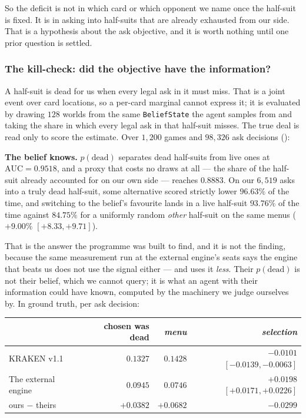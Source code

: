 \documentclass[11pt,letterpaper]{article}
\begin{document}
So the deficit is not in which card or which opponent we name once the
half-suit is fixed. It is in asking into half-suits that are already exhausted
from our side. That is a hypothesis about the ask objective, and it is worth
nothing until one prior question is settled.

\subsubsection{The kill-check: did the objective have the information?}

A half-suit is dead for us when every legal ask in it must miss. That is a
joint event over card locations, so a per-card marginal cannot express it; it
is evaluated by drawing $128$ worlds from the same \texttt{BeliefState} the
agent samples from and taking the share in which every legal ask in that
half-suit misses. The true deal is read only to score the estimate. Over
$1{,}200$ games and $98{,}326$ ask decisions
():

\textbf{The belief knows.} $p(\text{dead})$ separates dead half-suits from live
ones at $\mathrm{AUC} = 0.9518$, and a proxy that costs no draws at all --- the
share of the half-suit already accounted for on our own side --- reaches
$0.8883$. On our $6{,}519$ asks into a truly dead half-suit, some alternative
scored strictly lower $96.63\%$ of the time, and switching to the belief's
favourite lands in a live half-suit $93.76\%$ of the time against $84.75\%$ for
a uniformly random \emph{other} half-suit on the same menus
($+9.00\%$ $[+8.33, +9.71]$).

That is the answer the programme was built to find, and it is not the finding,
because the same measurement run at the external engine's seats says the engine that beats
us does not use the signal either --- and uses it \emph{less}. Their
$p(\text{dead})$ is not their belief, which we cannot query; it is what an agent
with their information could have known, computed by the machinery we judge
ourselves by. In ground truth, per ask decision:

\begin{center}
\small
\begin{tabular}{lrrr}
\toprule
 & chosen was dead & \emph{menu} & \emph{selection} \\
\midrule
KRAKEN v1.1 & $0.1327$ & $0.1428$ & $\mathbf{-0.0101}$ $[-0.0139, -0.0063]$ \\
The external engine & $0.0945$ & $0.0746$ & $\mathbf{+0.0198}$ $[+0.0171, +0.0226]$ \\
\midrule
ours $-$ theirs & $+0.0382$ & $+0.0682$ & $-0.0299$ \\
\bottomrule
\end{tabular}
\end{center}
\end{document}

